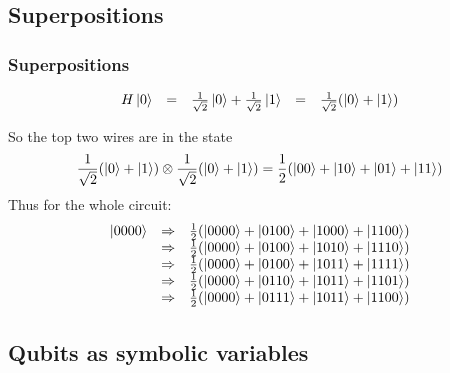 \documentclass{beamer}
\newcommand{\half}{\frac{1}{2}}
\newcommand{\shalf}{\frac{1}{\sqrt{2}}}
\begin{document}

\subsection[Superposition]{Superpositions}

\begin{frame}
  \frametitle{Superpositions}
  
\[\begin{array}{rclcl}
H\ket{0} &=& \shalf\ket{0} + \shalf\ket{1}
         &=& \frac{1}{\sqrt{2}} (\ket{0} + \ket{1})
 \end{array}\]

\begin{overprint}
So the top two wires are in the state
\[ \shalf(\ket{0}+\ket{1}) \otimes 
   \shalf(\ket{0}+\ket{1}) 
   = 
\half(\ket{00} + \ket{10} + \ket{01} + \ket{11})
\]
Thus for the whole circuit:
\[\begin{array}{rcl}
    \ket{0000} &\Rightarrow&
      \half (\ket{0000} + \ket{0100} + \ket{1000} + \ket{1100}) \\
    &\Rightarrow& 
      \half (\ket{0000} + \ket{0100} + \ket{1010} + \ket{1110}) \\
    &\Rightarrow& 
      \half (\ket{0000} + \ket{0100} + \ket{1011} + \ket{1111}) \\
    &\Rightarrow& 
      \half (\ket{0000} + \ket{0110} + \ket{1011} + \ket{1101}) \\
    &\Rightarrow& 
      \half (\ket{0000} + \ket{0111} + \ket{1011} + \ket{1100}) 
 \end{array}\]
\end{overprint}
\end{frame}

\subsection[Symbolic]{Qubits as symbolic variables}
\end{document}
